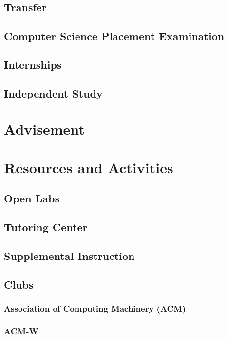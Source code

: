 \documentclass{book}
\begin{document}
\section{Transfer}

\section{Computer Science Placement Examination}

\section{Internships}

\section{Independent Study}

\chapter{Advisement}

\chapter{Resources and Activities}

\section{Open Labs}

\section{Tutoring Center}

\section{Supplemental Instruction}

\section{Clubs}
\subsection{Association of Computing Machinery (ACM)}

\subsection{ACM-W}
\end{document}
